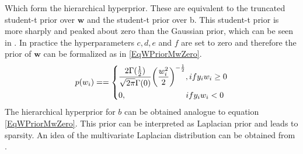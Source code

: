 Which form the hierarchical hyperprior.\cite{Chen.2014} These are equivalent to the truncated student-t prior over $\mathbf{w}$ and the student-t prior over b.\cite[p. 226]{Tipping.2001}\newline
This student-t prior is more sharply and peaked about zero than the Gaussian prior\cite{Chen.2009}, which can be seen in \cite[p. 688, 691-692]{Bishop.2009}.\newline
In practice the hyperparameters $c,d,e$ and $f$ are set to zero and therefore the prior of $\mathbf{w}$ can be formalized as in \ref{EqWPriorMwZero}.
\begin{equation}\label{EqWPriorMwZero}
	p(w_i) =
	=\begin{dcases}
	\frac{2\Gamma(\frac{1}{2})}{\sqrt{2\pi}\Gamma(0)}\bigg(\frac{w_i^2}{2} \bigg)^{-\frac{1}{2}}, if y_iw_i \ge 0\\ 
	0, \>\>\>\>\>\>\>\>\>\>\>\>\>\>\>\>\>\>\>\>\>\>\>\>\>\>\>\>\>\>\>\>\> if y_i w_i<0
	\end{dcases}
\end{equation}
The hierarchical hyperprior for $b$ can be obtained analogue to equation \eqref{EqWPriorMwZero}. This prior can be interpreted as Laplacian prior and leads to sparsity.\cite{Chen.2009} 
An idea of the multivariate Laplacian distribution can be obtained from \cite{Eltoft.2006}.
